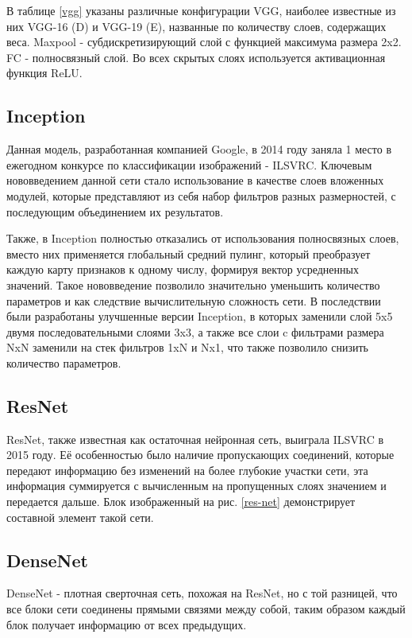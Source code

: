 В таблице \ref{vgg} указаны различные конфигурации VGG, наиболее известные из них VGG-16 (D) и VGG-19 (E), названные по количеству слоев, содержащих веса. Maxpool - субдискретизирующий слой с функцией максимума размера 2x2. FC - полносвязный слой. Во всех скрытых слоях используется активационная функция ReLU. 



\subsection{Inception}
Данная модель\cite{1512.00567}, разработанная компанией Google, в 2014 году заняла 1 место в ежегодном конкурсе по классификации изображений - ILSVRC. Ключевым нововведением данной сети стало использование в качестве слоев вложенных модулей, которые представляют из себя набор фильтров разных размерностей, с последующим объединением их результатов. 



Также, в Inception полностью отказались от использования полносвязных слоев, вместо них применяется глобальный средний пулинг, который преобразует каждую карту признаков к одному числу, формируя вектор усредненных значений. Такое нововведение позволило значительно уменьшить количество параметров и как следствие вычислительную сложность сети. В последствии были разработаны улучшенные версии Inception, в которых заменили слой 5x5 двумя последовательными слоями 3x3, а также все слои c фильтрами размера NxN заменили на стек фильтров 1xN и Nx1, что также позволило снизить количество параметров.

\subsection{ResNet}
ResNet\cite{ResNet}, также известная как остаточная нейронная сеть, выиграла ILSVRC в 2015 году. Её особенностью было наличие пропускающих соединений, которые передают информацию без изменений на более глубокие участки сети, эта информация суммируется с вычисленным на пропущенных слоях значением и передается дальше. Блок изображенный на рис. \ref{res-net} демонстрирует составной элемент такой сети.



\subsection{DenseNet}
DenseNet\cite{DenseNet} - плотная сверточная сеть, похожая на ResNet, но с той разницей, что все блоки сети соединены прямыми связями между собой, таким образом каждый блок получает информацию от всех предыдущих. 

